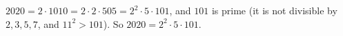 $2020=2\cdot1010=2\cdot2\cdot505=2^2\cdot5\cdot101$, and $101$ is prime (it is not divisible by $2,3,5,7$, and $11^2>101$). So $2020=\boxed{2^2\cdot5\cdot101}$.
